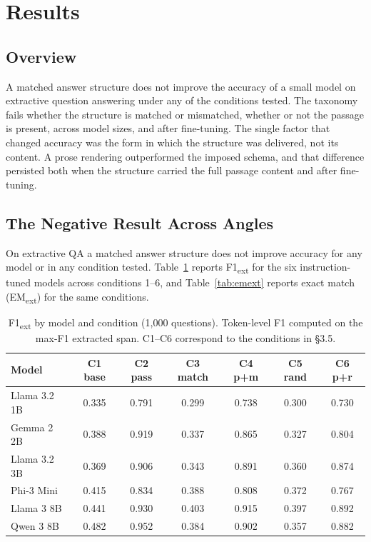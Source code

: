 \documentclass{article}
\begin{document}
\section{Results}

\subsection{Overview}

A matched answer structure does not improve the accuracy of a small model on extractive question answering under any of the conditions tested. The taxonomy fails whether the structure is matched or mismatched, whether or not the passage is present, across model sizes, and after fine-tuning. The single factor that changed accuracy was the form in which the structure was delivered, not its content. A prose rendering outperformed the imposed schema, and that difference persisted both when the structure carried the full passage content and after fine-tuning.

\subsection{The Negative Result Across Angles}

On extractive QA a matched answer structure does not improve accuracy for any model or in any condition tested. Table~\ref{tab:f1ext} reports F1\textsubscript{ext} for the six instruction-tuned models across conditions 1--6, and Table~\ref{tab:emext} reports exact match (EM\textsubscript{ext}) for the same conditions.

\begin{table}[h]
\centering
\begin{tabular}{lcccccc}
\toprule
Model & C1 base & C2 pass & C3 match & C4 p+m & C5 rand & C6 p+r \\
\midrule
Llama 3.2 1B & 0.335 & 0.791 & 0.299 & 0.738 & 0.300 & 0.730 \\
Gemma 2 2B   & 0.388 & 0.919 & 0.337 & 0.865 & 0.327 & 0.804 \\
Llama 3.2 3B & 0.369 & 0.906 & 0.343 & 0.891 & 0.360 & 0.874 \\
Phi-3 Mini   & 0.415 & 0.834 & 0.388 & 0.808 & 0.372 & 0.767 \\
Llama 3 8B   & 0.441 & 0.930 & 0.403 & 0.915 & 0.397 & 0.892 \\
Qwen 3 8B    & 0.482 & 0.952 & 0.384 & 0.902 & 0.357 & 0.882 \\
\bottomrule
\end{tabular}
\caption{F1\textsubscript{ext} by model and condition (1,000 questions). Token-level F1 computed on the max-F1 extracted span. C1--C6 correspond to the conditions in \S3.5.}
\label{tab:f1ext}
\end{table}
\end{document}
